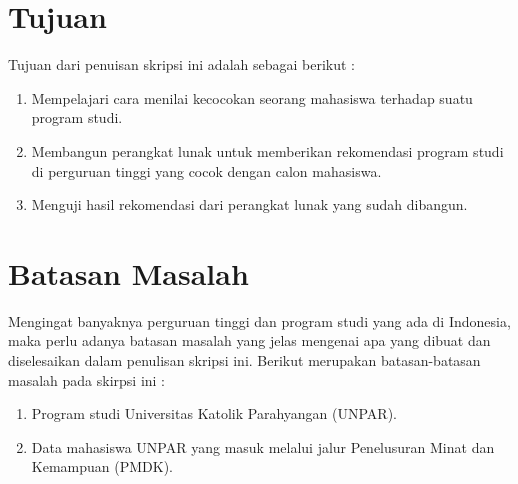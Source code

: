
\section{Tujuan}
\label{sec:tujuan}
Tujuan dari penuisan skripsi ini adalah sebagai berikut : \\

\begin{enumerate}
	\item Mempelajari cara menilai kecocokan seorang mahasiswa terhadap suatu program studi.
	\item Membangun perangkat lunak untuk memberikan rekomendasi program studi di perguruan tinggi yang cocok dengan calon mahasiswa.
	\item Menguji hasil rekomendasi dari perangkat lunak yang sudah dibangun.
\end{enumerate}


\section{Batasan Masalah}
\label{sec:batasan}
Mengingat banyaknya perguruan tinggi dan program studi yang ada di Indonesia, maka perlu adanya batasan masalah yang jelas mengenai apa yang dibuat dan diselesaikan dalam penulisan skripsi ini. Berikut merupakan batasan-batasan masalah pada skirpsi ini : \\
	\begin{enumerate}
		\item Program studi Universitas Katolik Parahyangan (UNPAR).
		\item Data mahasiswa UNPAR yang masuk melalui jalur Penelusuran Minat dan Kemampuan (PMDK).
	\end{enumerate}
	

